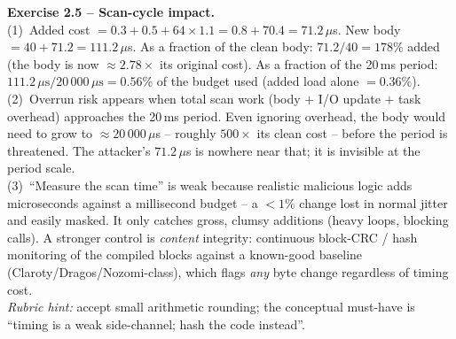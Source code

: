 \documentclass[11pt,a4paper]{article}
\begin{document}
\begin{solutionbox}
\textbf{Exercise 2.5 -- Scan-cycle impact.}\\[2pt]
(1)~Added cost $= 0.3 + 0.5 + 64 \times 1.1 = 0.8 + 70.4 = 71.2\,\mu$s. New body
$= 40 + 71.2 = 111.2\,\mu$s. As a fraction of the clean body:
$71.2/40 = 178\%$ added (the body is now $\approx 2.78\times$ its original cost). As a fraction of
the 20\,ms period: $111.2\,\mu\text{s} / 20\,000\,\mu\text{s} = 0.56\%$ of the budget
used (added load alone $= 0.36\%$).\\
(2)~Overrun risk appears when total scan work (body $+$ I/O update $+$ task overhead) approaches
the 20\,ms period. Even ignoring overhead, the body would need to grow to $\approx 20\,000\,\mu$s
-- roughly $500\times$ its clean cost -- before the period is threatened. The attacker's
$71.2\,\mu$s is nowhere near that; it is invisible at the period scale.\\
(3)~``Measure the scan time'' is weak because realistic malicious logic adds microseconds against a
millisecond budget -- a $<1\%$ change lost in normal jitter and easily masked. It only catches gross,
clumsy additions (heavy loops, blocking calls). A stronger control is \emph{content} integrity:
continuous block-CRC / hash monitoring of the compiled blocks against a known-good baseline
(Claroty/Dragos/Nozomi-class), which flags \emph{any} byte change regardless of timing cost.\\[2pt]
\emph{Rubric hint:} accept small arithmetic rounding; the conceptual must-have is ``timing is a
weak side-channel; hash the code instead''.
\end{solutionbox}
\end{document}
